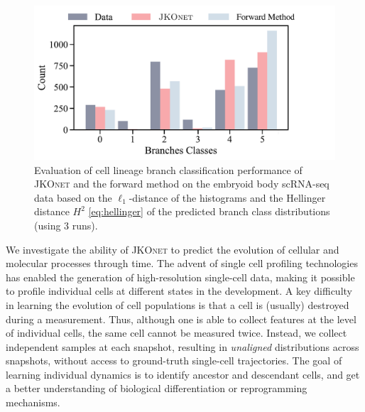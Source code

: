 \begin{figure}[t]
    \includegraphics[width=.47\linewidth]{figures/fig_distribution_cell_types_Branches.pdf}
	\qquad
\caption{Evaluation of cell lineage branch classification performance of \textsc{JKOnet} and the forward method on the embryoid body scRNA-seq data based on the $\ell_1$-distance of the histograms and the Hellinger distance $H^2$ \eqref{eq:hellinger} of the predicted branch class distributions (using 3 runs). \vspace{10pt}}
\label{tab:exp_jkonet_cell_class}
\end{figure}

We investigate the ability of \textsc{JKOnet} to predict the evolution of cellular and molecular processes through time.
The advent of single cell profiling technologies has enabled the generation of high-resolution single-cell data, making it possible to profile individual cells at different states in the development. 
A key difficulty in learning the evolution of cell populations is that a cell is (usually)  destroyed during a measurement. Thus, although one is able to collect features at the level of individual cells, the same cell cannot be measured twice. Instead, we collect independent samples at each snapshot, resulting in \emph{unaligned} distributions across snapshots, without access to ground-truth single-cell trajectories. 
The goal of learning individual dynamics is to identify ancestor and descendant cells, and get a better understanding of biological differentiation or reprogramming mechanisms. 

